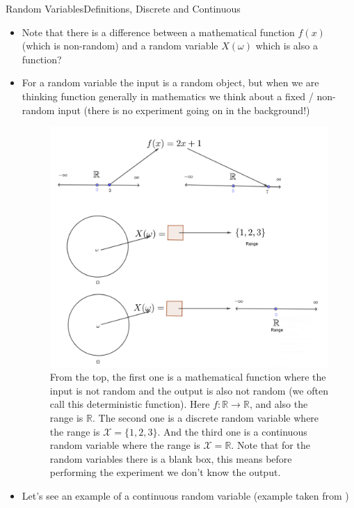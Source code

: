 \documentclass[8pt, usepdftitle=false]{beamer}
\begin{document}
\begin{frame}[allowframebreaks]{Random Variables}{Definitions, Discrete and Continuous}
\begin{itemize}
\item Note that there is a difference between a mathematical function $f(x)$ (which is non-random) and a random variable $X(\omega)$ which is also a function? 

\item For a random variable the input is a random object, but when we are thinking function generally in mathematics we think about a fixed / non-random input (there is no experiment going on in the background!)


\framebreak


\begin{figure}
\includegraphics[scale = .2]{Images/RVs_OFs.png}
\caption{From the top, the first one is a mathematical function where the input is not random and the output is also not random (we often call this deterministic function). Here $f: \mathbb{R} \to \mathbb{R}$, and also the range is $\mathbb{R}$. The second one is a discrete random variable where the range is $\mathcal{X} = \{1, 2, 3 \}$. And the third one is a continuous random variable where the range is $\mathcal{X} = \mathbb{R}$. Note that for the random variables there is a blank box, this means before performing the experiment we don't know the output.}
\end{figure}


\item Let's see an example of a continuous random variable (example taken from \cite{degroot_probability_2012})



\end{itemize}
\end{frame}
\end{document}
